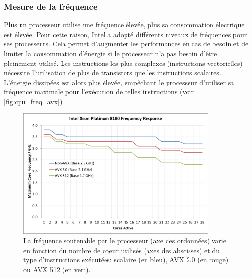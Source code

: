     \subsubsection{Mesure de la fréquence}
        Plus un processeur utilise une fréquence élevée, plus sa consommation électrique est élevée. Pour cette raison, Intel a adopté différents niveaux de fréquences pour ses processeurs. Cela permet d'augmenter les performances en cas de besoin et de limiter la consommation d'énergie si le processeur n'a pas besoin d'être pleinement utilisé. Les instructions les plus complexes (instructions vectorielles) nécessite l'utilisation de plus de transistors que les instructions scalaires. L'énergie dissipées est alors plus élevée, empêchant le processeur d'utiliser sa fréquence maximale pour l'exécution de telles instructions (voir \autoref{fig:cpu_freq_avx}). 
        
        \begin{figure}
            \center
            \includegraphics[width=10cm]{images/cpu_freq_avx.png}
            \caption{\label{fig:cpu_freq_avx} La fréquence soutenable par le processeur (axe des ordonnées) varie en fonction du nombre de coeur utilisés (axes des abscisses) et du type d'instructions exécutées: scalaire (en bleu), AVX 2.0 (en rouge) ou AVX 512 (en vert)\protect\footnotemark.}
        \end{figure}
        
